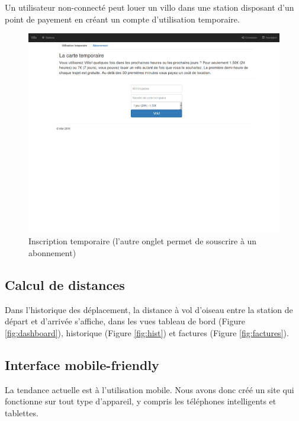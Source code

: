\documentclass[a4paper,10pt]{article}
\begin{document}
Un utilisateur non-connecté peut louer un villo dans une station disposant d'un point
de payement en créant un compte d'utilisation temporaire.

\begin{figure}[H]
  \centering
  \includegraphics[width=.9\textwidth]{inscription.png}
  \caption{\label{fig:inscr} Inscription temporaire (l'autre onglet permet de souscrire à un abonnement)}
\end{figure}


\subsection{Calcul de distances}
Dans l'historique des déplacement, la distance à vol d'oiseau entre la station
de départ et d'arrivée s'affiche, dans les vues tableau de bord (Figure \ref{fig:dashboard}),
historique (Figure \ref{fig:hist}) et factures (Figure \ref{fig:factures}).

\subsection{Interface mobile-friendly}
La tendance actuelle est à l'utilisation mobile. Nous avons donc créé un site qui
fonctionne sur tout type d'appareil, y compris les téléphones intelligents et tablettes. 
\end{document}
